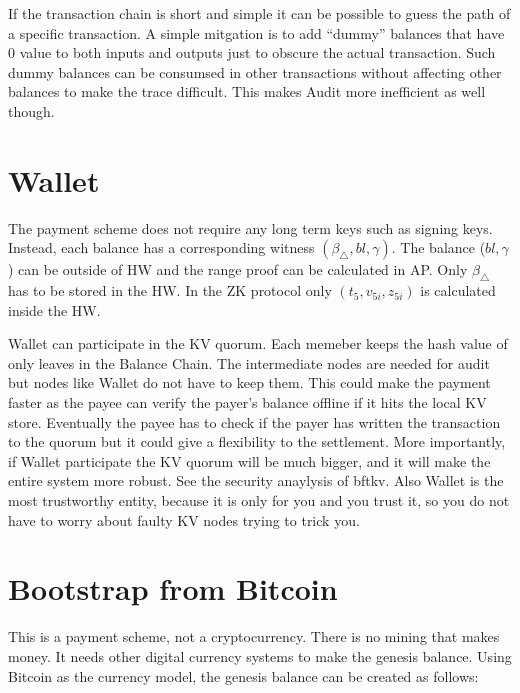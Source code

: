 \documentclass[10pt,fleqn]{article}
\begin{document}
If the transaction chain is short and simple it can be possible to guess the path of a specific transaction. A simple mitgation is to add ``dummy'' balances that have 0 value to both inputs and outputs just to obscure the actual transaction. Such dummy balances can be consumsed in other transactions without affecting other balances to make the trace difficult. This makes Audit more inefficient as well though.

\section{Wallet}
The payment scheme does not require any long term keys such as signing keys. Instead, each balance has a corresponding witness $(\beta_{\triangle}, bl, \gamma)$. The balance ($bl, \gamma$) can be outside of HW and the range proof can be calculated in AP. Only $\beta_{\triangle}$ has to be stored in the HW. In the ZK protocol only $(t_5, v_{5i}, z_{5i})$ is calculated inside the HW.

Wallet can participate in the KV quorum. Each memeber keeps the hash value of only leaves in the Balance Chain. The intermediate nodes are needed for audit but nodes like Wallet do not have to keep them. This could make the payment faster as the payee can verify the payer's balance offline if it hits the local KV store. Eventually the payee has to check if the payer has written the transaction to the quorum but it could give a flexibility to the settlement. More importantly, if Wallet participate the KV quorum will be much bigger, and it will make the entire system more robust. See the security anaylysis of \textsf{bftkv}. Also Wallet is the most trustworthy entity, because it is only for you and you trust it, so you do not have to worry about faulty KV nodes trying to trick you.

\section{Bootstrap from Bitcoin}
This is a payment scheme, not a cryptocurrency. There is no mining that makes money. It needs other digital currency systems to make the genesis balance. Using Bitcoin as the currency model, the genesis balance can be created as follows:
\end{document}
